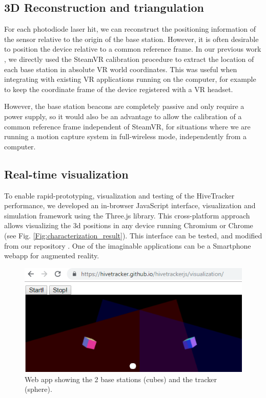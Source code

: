 \documentclass[sigchi]{acmart}
\begin{document}
\subsection{3D Reconstruction and triangulation}

For each photodiode laser hit, we can reconstruct the positioning information of the sensor relative to the origin of the base station. However, it is often desirable to position the device relative to a common reference frame. In our previous work \cite{Quinones2018}, we directly used the SteamVR calibration procedure to extract the location of each base station in absolute VR world coordinates. This was useful when integrating with existing VR applications running on the computer, for example to keep the coordinate frame of the device registered with a VR headset.

However, the base station beacons are completely passive and only require a power supply, so it would also be an advantage to allow the calibration of a common reference frame independent of SteamVR, for situations where we are running a motion capture system in full-wireless mode, independently from a computer.


\subsection{Real-time visualization}

To enable rapid-prototyping, visualization and testing of the HiveTracker performance, we developed an in-browser JavaScript interface, visualization and simulation framework using the Three.js library. This cross-platform approach allows visualizing the 3d positions in any device running Chromium or Chrome (see Fig. \ref{Fig:characterization_result}). This interface can be tested, and modified from our repository \cite{WebappRepo}.
One of the imaginable applications can be a Smartphone webapp for augmented reality.

\begin{figure}[h]
  \centering
  \includegraphics[width=\linewidth]{Figures/webapp.png}
  \caption{Web app showing the 2 base stations (cubes) and the tracker (sphere).}
  \label{Fig:webapp}
\end{figure}
\end{document}
